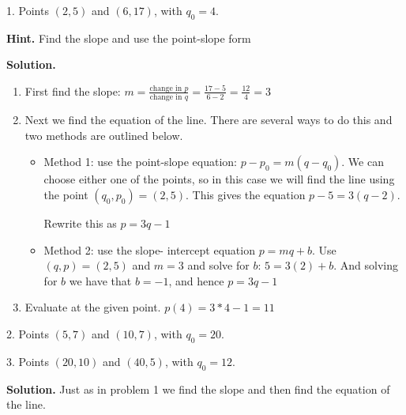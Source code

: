 \documentclass[10pt,]{book}
\theoremstyle{plain}
\theoremstyle{definition}
\theoremstyle{definition}
\begin{document}
\begin{exerciselist}
\item[1.]\hypertarget{exercise-1}{} 
Points \((2,5)\) and \((6,17)\), with \(q_0=4\).
%
\par\smallskip
\par\smallskip
\noindent\textbf{Hint.}\hypertarget{hint-1}{}\quad
Find the slope and use the point-slope form%
\par\smallskip
\noindent\textbf{Solution.}\hypertarget{solution-1}{}\quad
\leavevmode%
\begin{enumerate}[label=(\alph*)]
\item\hypertarget{li-26}{}First find the slope: \(m=  \frac{\text{change in }p}{\text{change in }q}
=  \frac{17-5}{6-2}=\frac{12}{4}=3\)%
\item\hypertarget{li-27}{}Next we find the equation of the line. There are several ways to do this and two methods are outlined below.%
%
\begin{itemize}[label=\textbullet]
\item{}Method 1: use the point-slope equation: \(p-p_0=m (q-q_0)\).
We can choose either one of the points, so in this case we will find the line using the point \((q_0,p_0 )=(2,5)\). This gives the equation
\(p-5=3 (q-2)\).%
\par
Rewrite this as \(p=3q-1\)%
\item{}Method 2: use the slope- intercept equation \(p=m q+b\).
Use \((q,p)=(2,5)\) and \(m = 3\) and solve for \(b\):
\(5=3 (2)+b\).
And solving for \(b\) we have that \(b= -1\), and hence \(p=3q-1\)%
\end{itemize}
\item\hypertarget{li-30}{}Evaluate at the given point.  \(p(4)=3*4-1=11\)%
\end{enumerate}
\item[2.]\hypertarget{exercise-2}{} Points \((5,7)\) and \((10,7)\), with \(q_0=20\).
%
\par\smallskip
\item[3.]\hypertarget{exercise-3}{} Points \((20,10)\) and \((40,5)\), with \(q_0=12\).
%
\par\smallskip
\par\smallskip
\noindent\textbf{Solution.}\hypertarget{solution-2}{}\quad
Just as in problem 1 we find the slope and then find the equation of the line.%
\leavevmode%
\end{exerciselist}
\end{document}
